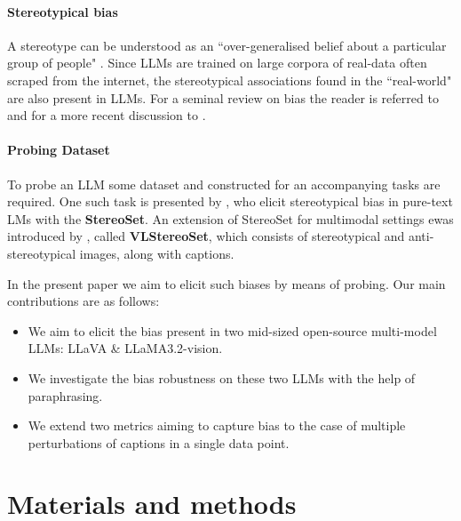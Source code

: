 \documentclass[11pt]{article}
\begin{document}
\paragraph{Stereotypical bias} A stereotype can be understood as an ``over-generalised belief about a particular group of people" \citep[1]{nadeem_stereoset_2021}. Since LLMs are trained on large corpora of real-data often scraped from the internet, the stereotypical associations found in the ``real-world" are also present in LLMs. For a seminal review on bias the reader is referred to \citet{blodgett_language_2020} and for a more recent discussion to \citet{navigli_biases_2023}.

\paragraph{Probing Dataset} To probe an LLM some dataset and constructed for an accompanying tasks are required. One such task is presented by \citet{nadeem_stereoset_2021}, who elicit stereotypical bias in pure-text LMs with the \textbf{StereoSet}. An extension of StereoSet for multimodal settings ewas introduced by \citet{zhou_vlstereoset_2022}, called \textbf{VLStereoSet}, which consists of stereotypical and anti-stereotypical images, along with captions.


In the present paper we aim to elicit such biases by means of probing. Our main contributions are as follows:
\begin{itemize}
    \item We aim to elicit the bias present in two mid-sized open-source multi-model LLMs: LLaVA \& LLaMA3.2-vision.
    \item We investigate the bias robustness on these two LLMs with the help of paraphrasing.
    \item We extend two metrics aiming to capture bias to the case of multiple perturbations of captions in a single data point.
\end{itemize}

\section{Materials and methods}

\end{document}
